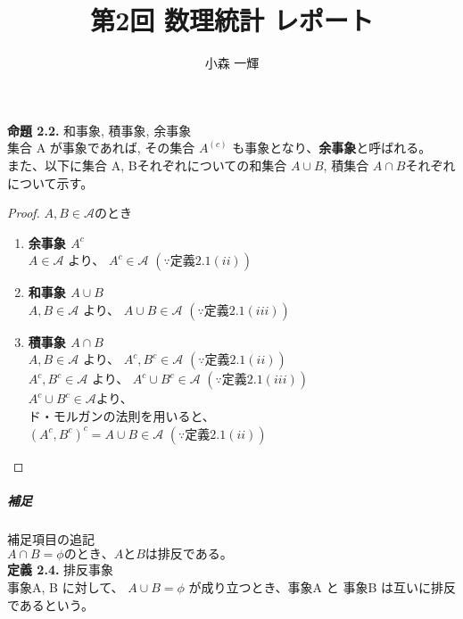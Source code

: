 \documentclass[dvipdfmx,10pt, a4j]{jarticle}
\title{第2回 数理統計 レポート}
\author{小森 一輝}
\theoremstyle{definition}
\begin{document}
    \maketitle

\setcounter{section}{2}
    \noindent
    \textbf{命題 2.2.} 和事象, 積事象, 余事象\\
    集合 A が事象であれば, その集合 $A^(c)$ も事象となり、\textbf{余事象}と呼ばれる。\\
    また、以下に集合 A, Bそれぞれについての和集合 $A \cup B$, 積集合 $A \cap B$それぞれについて示す。
    \begin{proof} $A, B \in \mathcal{A}$のとき\\
        \begin{enumerate}
            \renewcommand{\labelenumi}{\roman{enumi})}
            \item \textbf{余事象 $A^{c}$} \\
                $A \in \mathcal{A}$ より、 $A^{c} \in \mathcal{A}$ $(\because 定義2.1(ii))$
            \item \textbf{和事象 $A \cup B$} \\
                $A, B \in \mathcal{A}$ より、 $A \cup B \in \mathcal{A}$ $(\because 定義2.1(iii))$
            \item \textbf{積事象 $A \cap B$} \\
                $A, B \in \mathcal{A}$ より、 $A^{c}, B^{c} \in \mathcal{A}$ $(\because 定義2.1(ii))$\\
                $A^{c}, B^{c} \in \mathcal{A}$ より、 $A^{c} \cup B^{c} \in \mathcal{A}$ $(\because 定義2.1(iii))$\\
                $A^{c} \cup B^{c} \in \mathcal{A}$より、\\
                ド・モルガンの法則を用いると、\\
                $(A^{c}, B^{c})^{c} = A \cup B \in \mathcal{A}$ $(\because 定義2.1(ii))$
        \end{enumerate}
    \end{proof}
    \subparagraph*{補足}
    補足項目の追記\\
    $A \cap B = \phi のとき、A と B は排反である。$\\

    \noindent
    \textbf{定義 2.4.} 排反事象\\
    事象A, B に対して、 $A \cup B = \phi$ が成り立つとき、事象A と 事象B は互いに排反であるという。\\
\end{document}

